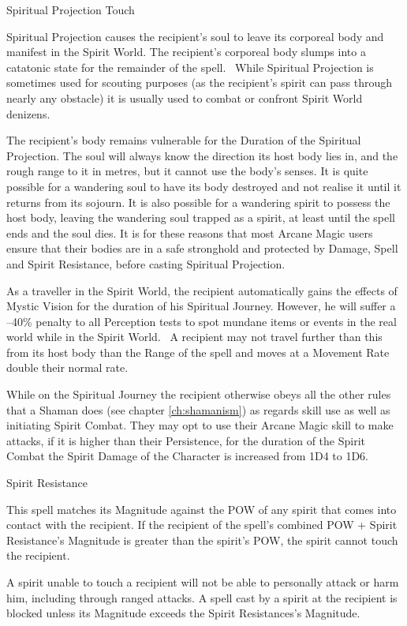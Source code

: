 \begin{samepage}
\begin{rpg-spell}
{Spiritual Projection}
{Touch}

Spiritual Projection causes the recipient’s soul to leave its corporeal body and manifest in the Spirit World. The recipient’s corporeal body slumps into a catatonic state for the remainder of the spell.  While Spiritual Projection is sometimes used for scouting purposes (as the recipient’s spirit can pass through nearly any obstacle) it is usually used to combat or confront Spirit World denizens.

The recipient’s body remains vulnerable for the Duration of the Spiritual Projection. The soul will always know the direction its host body lies in, and the rough range to it in metres, but it cannot use the body’s senses. It is quite possible for a wandering soul to have its body destroyed and not realise it until it returns from its sojourn. It is also possible for a wandering spirit to possess the host body, leaving the wandering soul trapped as a spirit, at least until the spell ends and the soul dies. It is for these reasons that most Arcane Magic users ensure that their bodies are in a safe stronghold and protected by Damage, Spell and Spirit Resistance, before casting Spiritual Projection.

As a traveller in the Spirit World, the recipient automatically gains the effects of Mystic Vision for the duration of his Spiritual Journey. However, he will suffer a –40\% penalty to all Perception tests to spot mundane items or events in the real world while in the Spirit World.  A recipient may not travel further than this from its host body than the Range of the spell and moves at a Movement Rate double their normal rate.

	While on the Spiritual Journey the recipient otherwise obeys all the other rules that a Shaman does (see chapter \ref{ch:shamanism}) as regards skill use as well as initiating Spirit Combat. They may opt to use their Arcane Magic skill to make attacks, if it is higher than their Persistence, for the duration of the Spirit Combat the Spirit Damage of the Character is increased from 1D4 to 1D6.
\end{rpg-spell}
\end{samepage}


\begin{samepage}
\begin{rpg-spell}
{Spirit Resistance}
{}

This spell matches its Magnitude against the POW of any spirit that comes into contact with the recipient. If the recipient of the spell’s combined POW + Spirit Resistance’s Magnitude is greater than the spirit’s POW, the spirit cannot touch the recipient. 

A spirit unable to touch a recipient will not be able to personally attack or harm him, including through ranged attacks. A spell cast by a spirit at the recipient is blocked unless its Magnitude exceeds the Spirit Resistances’s Magnitude. 
\end{rpg-spell}
\end{samepage}


